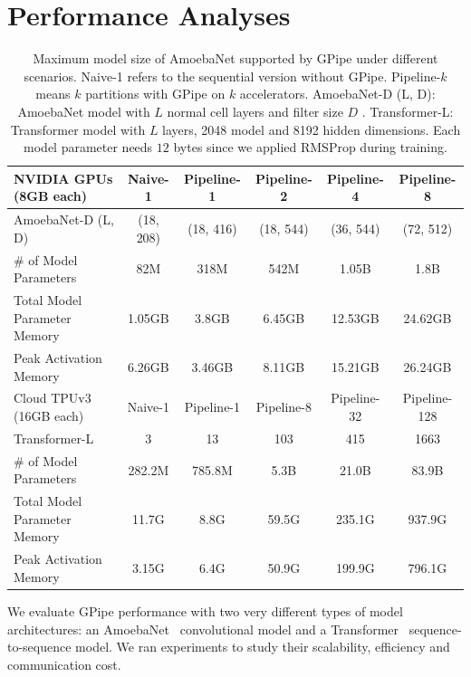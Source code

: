 \documentclass{article}
\def\codename{GPipe}
\begin{document}
\section{Performance Analyses}
\begin{table}[t]
\begin{small}
\begin{center}
\caption{Maximum model size of AmoebaNet supported by \codename{} under different scenarios. Naive-1 refers to the sequential version without \codename{}. Pipeline-$k$ means $k$ partitions with \codename{} on $k$ accelerators. AmoebaNet-D (L, D): AmoebaNet model with $L$ normal cell layers and filter size $D$ .  Transformer-L: Transformer model with $L$ layers, 2048 model and 8192 hidden dimensions. Each model parameter needs $12$ bytes since we applied RMSProp during training.}
\label{results_memory_tab}
\begin{tabular}{lccccc}
\toprule
 NVIDIA GPUs (8GB each) & Naive-1  & Pipeline-1 & Pipeline-2 & Pipeline-4 & Pipeline-8  \\
\midrule
AmoebaNet-D (L, D) &  (18, 208) & (18, 416) &  (18, 544) & (36, 544) & (72, 512) \\
\# of Model Parameters & 82M & 318M & 542M & 1.05B & 1.8B \\
Total Model Parameter Memory & 1.05GB & 3.8GB & 6.45GB & 12.53GB & 24.62GB \\ 
Peak Activation Memory & 6.26GB & 3.46GB & 8.11GB & 15.21GB & 26.24GB\\ 
\midrule
 Cloud TPUv3 (16GB each) & Naive-1  & Pipeline-1  & Pipeline-8 & Pipeline-32 & Pipeline-128  \\
\midrule
Transformer-L & 3   & 13 & 103 & 415 & 1663 \\
\# of Model Parameters & 282.2M & 785.8M & 5.3B  & 21.0B & 83.9B \\
Total Model Parameter Memory & 11.7G & 8.8G  &  59.5G & 235.1G & 937.9G \\ 
Peak Activation Memory & 3.15G & 6.4G  &  50.9G & 199.9G & 796.1G \\ 
\bottomrule
\end{tabular}
\end{center}
\end{small}
\end{table}

We evaluate \codename{} performance with two very different types of model architectures: an AmoebaNet~\cite{real2018regularized} convolutional model and a Transformer~\cite{vaswani2017attention}  sequence-to-sequence model. We ran experiments to study their scalability, efficiency and communication cost.
\end{document}
